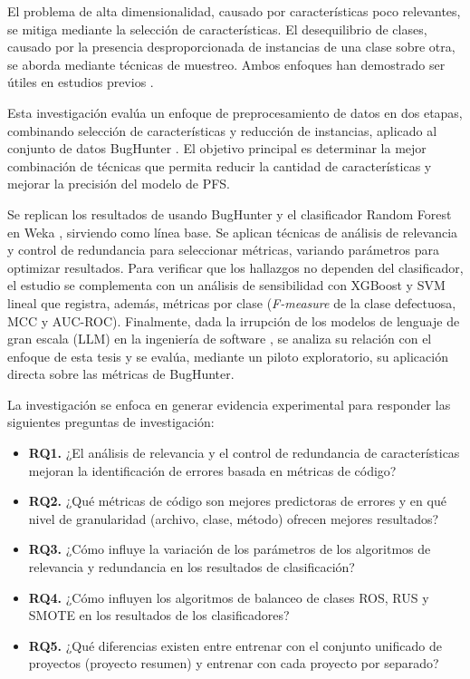 El problema de alta dimensionalidad, causado por características poco relevantes, se mitiga mediante la selección de características. El desequilibrio de clases, causado por la presencia desproporcionada de instancias de una clase sobre otra, se aborda mediante técnicas de muestreo. Ambos enfoques han demostrado ser útiles en estudios previos \cite{liu_empirical_2015}.

Esta investigación evalúa un enfoque de preprocesamiento de datos en dos etapas, combinando selección de características y reducción de instancias, aplicado al conjunto de datos BugHunter \cite{ferenc_automatically_2020}. El objetivo principal es determinar la mejor combinación de técnicas que permita reducir la cantidad de características y mejorar la precisión del modelo de PFS.

Se replican los resultados de \cite{ferenc_automatically_2020} usando BugHunter y el clasificador Random Forest en Weka \cite{weka}, sirviendo como línea base. Se aplican técnicas de análisis de relevancia y control de redundancia para seleccionar métricas, variando parámetros para optimizar resultados. Para verificar que los hallazgos no dependen del clasificador, el estudio se complementa con un análisis de sensibilidad con XGBoost y SVM lineal que registra, además, métricas por clase (\textit{F-measure} de la clase defectuosa, MCC y AUC-ROC). Finalmente, dada la irrupción de los modelos de lenguaje de gran escala (LLM) en la ingeniería de software \cite{hou2024,zhang2026llm4se}, se analiza su relación con el enfoque de esta tesis y se evalúa, mediante un piloto exploratorio, su aplicación directa sobre las métricas de BugHunter.

La investigación se enfoca en generar evidencia experimental para responder las siguientes preguntas de investigación:

\begin{itemize}
    \item \textbf{RQ1.} ¿El análisis de relevancia y el control de redundancia de características mejoran la identificación de errores basada en métricas de código?
    \item \textbf{RQ2.} ¿Qué métricas de código son mejores predictoras de errores y en qué nivel de granularidad (archivo, clase, método) ofrecen mejores resultados?
    \item \textbf{RQ3.} ¿Cómo influye la variación de los parámetros de los algoritmos de relevancia y redundancia en los resultados de clasificación?
    \item \textbf{RQ4.} ¿Cómo influyen los algoritmos de balanceo de clases ROS, RUS y SMOTE en los resultados de los clasificadores?
    \item \textbf{RQ5.} ¿Qué diferencias existen entre entrenar con el conjunto unificado de proyectos (proyecto resumen) y entrenar con cada proyecto por separado?
\end{itemize}

